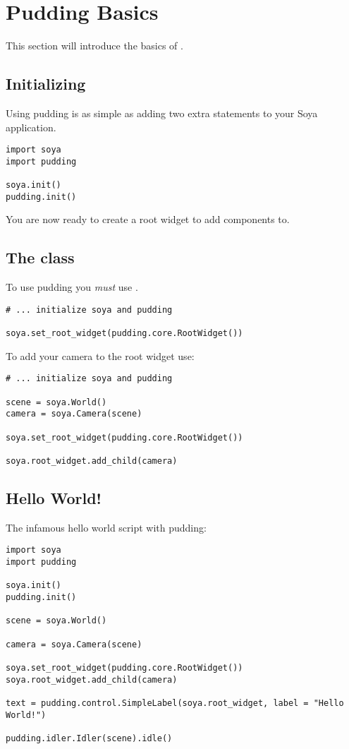 \documentclass{howto}
\begin{document}
\section{Pudding Basics}

This section will introduce the basics of .

\subsection{Initializing }

Using pudding is as simple as adding two extra statements to your Soya application.

\begin{verbatim}
import soya
import pudding

soya.init()
pudding.init()
\end{verbatim}

You are now ready to create a  root widget to add components to. 

\subsection{The  class}

To use pudding you \emph{must} use .

\begin{verbatim}
# ... initialize soya and pudding

soya.set_root_widget(pudding.core.RootWidget())
\end{verbatim}

To add your camera to the root widget use:

\begin{verbatim}
# ... initialize soya and pudding

scene = soya.World()
camera = soya.Camera(scene)

soya.set_root_widget(pudding.core.RootWidget())

soya.root_widget.add_child(camera)

\end{verbatim}

\subsection{Hello World!}

The infamous hello world script with pudding:

\begin{verbatim}
import soya
import pudding

soya.init()
pudding.init()

scene = soya.World()

camera = soya.Camera(scene)

soya.set_root_widget(pudding.core.RootWidget())
soya.root_widget.add_child(camera)

text = pudding.control.SimpleLabel(soya.root_widget, label = "Hello World!")

pudding.idler.Idler(scene).idle()
\end{verbatim}
\end{document}
